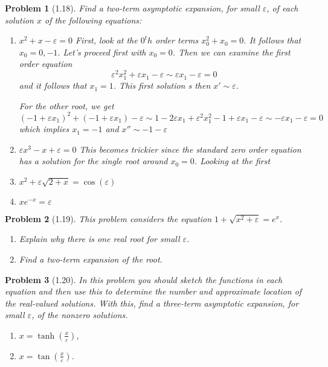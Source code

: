 \documentclass[11pt]{article}
\newcommand{\vep}{\varepsilon}
\theoremstyle{problemstyle}
\newtheorem{problem}{Problem}
\begin{document}
\newpage
\begin{problem}[1.18]
  Find a two-term asymptotic expansion, for small $\vep$, of each solution $x$ of the
  following equations:
  \begin{enumerate}
    \item $x^2 + x - \vep = 0$
      First, look at the $0^th$ order terms $x_0^2 + x_0 = 0$. It follows that $x_0 = 0,-1$. Let's
      proceed first with $x_0 = 0$. Then we can examine the first order equation
      \[\vep^2 x_1^2 + \vep x_1 - \vep \sim \vep x_1 - \vep = 0 \]
      and it follows that $x_1 = 1$. This first solution s then $x' \sim \vep$.

      For the other root, we get
      \[(-1 + \vep x_1)^2 + (-1 + \vep x_1) - \vep \sim 1 - 2\vep x_1 + \vep^2 x_1^2 - 1 + \vep x_1
        - \vep \sim -\vep x_1 - \vep = 0 \]
      which implies $x_1 = - 1$ and $x'' \sim - 1 - \vep$
    \item[(e)] $\vep x^3 -x + \vep = 0$
      This becomes trickier since the standard zero order equation has a solution for the single
      root around $x_0 = 0$. Looking at the first 
    \item[(h)] $x^2 + \vep \sqrt{2+x} = \cos(\vep)$
    \item[(p)] $xe^{-x} = \vep$
  \end{enumerate}
\end{problem}

\newpage
\begin{problem}[1.19]
  This problem considers the equation $1 + \sqrt{x^2 + \vep} = e^x$.
  \begin{enumerate}
    \item Explain why there is one real root for small $\vep$.
    \item Find a two-term expansion of the root.
  \end{enumerate}
\end{problem}

\newpage
\begin{problem}[1.20]
  In this problem you should sketch the functions in each equation and then use this to determine
  the number and approximate location of the real-valued solutions. With this, find a three-term
  asymptotic expansion, for small $\vep$, of the nonzero solutions.
  \begin{enumerate}
    \item $x = \tanh \left(\frac{x}{\vep}\right)$,
    \item $x = \tan\left(\frac{x}{\vep}\right)$.
  \end{enumerate}
\end{problem}
\end{document}
